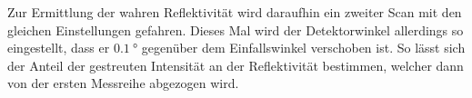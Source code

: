 Zur Ermittlung der wahren Reflektivität wird daraufhin ein zweiter Scan mit den gleichen Einstellungen gefahren. Dieses Mal wird der Detektorwinkel allerdings so eingestellt, dass er $\SI{0.1}{\degree}$ gegenüber dem Einfallswinkel verschoben ist. So lässt sich der Anteil der gestreuten Intensität an der Reflektivität bestimmen, welcher dann von der ersten Messreihe abgezogen wird.
